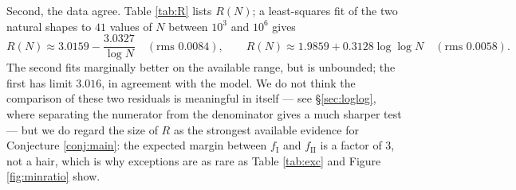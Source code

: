 \documentclass[11pt,reqno]{amsart}
\theoremstyle{plain}
\theoremstyle{definition}
\numberwithin{equation}{section}
\newcommand{\fI}{f_{\mathrm{I}}}
\newcommand{\fII}{f_{\mathrm{II}}}
\begin{document}
Second, the data agree. Table \ref{tab:R} lists $R(N)$; a least-squares fit of the two
natural shapes to $41$ values of $N$ between $10^{3}$ and $10^{6}$ gives
\[
  R(N)\approx3.0159-\frac{3.0327}{\log N}\quad(\text{rms }0.0084),\qquad
  R(N)\approx1.9859+0.3128\log\log N\quad(\text{rms }0.0058).
\]
The second fits marginally better on the available range, but is unbounded; the first
has limit $3.016$, in agreement with the model. We do not think the comparison of
these two residuals is meaningful in itself --- see \S\ref{sec:loglog}, where
separating the numerator from the denominator gives a much sharper test --- but we do
regard the size of $R$ as the strongest available evidence for Conjecture
\ref{conj:main}: the expected margin between $\fI$ and $\fII$ is a factor of $3$, not
a hair, which is why exceptions are as rare as Table \ref{tab:exc} and Figure
\ref{fig:minratio} show.
\end{document}
